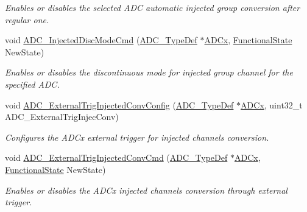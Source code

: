 \begin{DoxyCompactItemize}
\begin{DoxyCompactList}\small\item\em Enables or disables the selected A\+DC automatic injected group conversion after regular one. \end{DoxyCompactList}\item 
void \mbox{\hyperlink{group___a_d_c___private___functions_ga0b583b94183fa4ff287177b9ee808092}{A\+D\+C\+\_\+\+Injected\+Disc\+Mode\+Cmd}} (\mbox{\hyperlink{struct_a_d_c___type_def}{A\+D\+C\+\_\+\+Type\+Def}} $\ast$\mbox{\hyperlink{group___s_t_m32_f1_x_x___n_u_c_l_e_o___l_o_w___l_e_v_e_l___exported___constants_gab44c1065d38c298955fc028346984340}{A\+D\+Cx}}, \mbox{\hyperlink{group___exported__types_gac9a7e9a35d2513ec15c3b537aaa4fba1}{Functional\+State}} New\+State)
\begin{DoxyCompactList}\small\item\em Enables or disables the discontinuous mode for injected group channel for the specified A\+DC. \end{DoxyCompactList}\item 
void \mbox{\hyperlink{group___a_d_c___private___functions_gafc02ce1e84e96b692adf085f61a0bca6}{A\+D\+C\+\_\+\+External\+Trig\+Injected\+Conv\+Config}} (\mbox{\hyperlink{struct_a_d_c___type_def}{A\+D\+C\+\_\+\+Type\+Def}} $\ast$\mbox{\hyperlink{group___s_t_m32_f1_x_x___n_u_c_l_e_o___l_o_w___l_e_v_e_l___exported___constants_gab44c1065d38c298955fc028346984340}{A\+D\+Cx}}, uint32\+\_\+t A\+D\+C\+\_\+\+External\+Trig\+Injec\+Conv)
\begin{DoxyCompactList}\small\item\em Configures the A\+D\+Cx external trigger for injected channels conversion. \end{DoxyCompactList}\item 
void \mbox{\hyperlink{group___a_d_c___private___functions_gad81d134c083d8f407c819e6f4722d553}{A\+D\+C\+\_\+\+External\+Trig\+Injected\+Conv\+Cmd}} (\mbox{\hyperlink{struct_a_d_c___type_def}{A\+D\+C\+\_\+\+Type\+Def}} $\ast$\mbox{\hyperlink{group___s_t_m32_f1_x_x___n_u_c_l_e_o___l_o_w___l_e_v_e_l___exported___constants_gab44c1065d38c298955fc028346984340}{A\+D\+Cx}}, \mbox{\hyperlink{group___exported__types_gac9a7e9a35d2513ec15c3b537aaa4fba1}{Functional\+State}} New\+State)
\begin{DoxyCompactList}\small\item\em Enables or disables the A\+D\+Cx injected channels conversion through external trigger. \end{DoxyCompactList}\item 

\end{DoxyCompactItemize}
